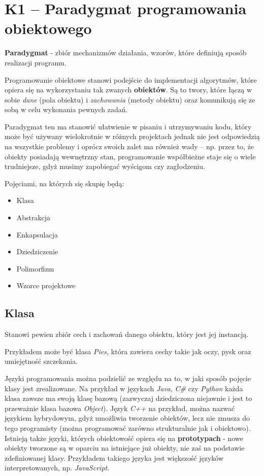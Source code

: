 \section{K1 -- Paradygmat programowania obiektowego}

\textbf{Paradygmat} - zbiór mechanizmów działania, wzorów, które definiują sposób realizacji programu.

Programowanie obiektowe stanowi podejście do implementacji algorytmów, które opiera się na wykorzystaniu tak zwanych \textbf{obiektów}. Są to twory, które łączą w sobie \textit{dane} (pola obiektu) i \textit{zachowania} (metody obiektu) oraz komunikują się ze sobą w celu wykonania pewnych zadań.

Paradygmat ten ma stanowić ułatwienie w pisaniu i utrzymywaniu kodu, który może być używany wielokrotnie w różnych projektach jednak nie jest odpowiedzią na wszystkie problemy i oprócz swoich zalet ma również wady -- np. przez to, że obiekty posiadają wewnętrzny stan, programowanie współbieżne staje się o wiele trudniejsze, gdyż musimy zapobiegać wyścigom czy zagłodzeniu.

Pojęciami, na których się skupię będą:
\begin{itemize}
	\item Klasa
	\item Abstrakcja
	\item Enkapsulacja
	\item Dziedziczenie
	\item Polimorfizm
	\item Wzorce projektowe
\end{itemize}

\subsection{Klasa}
Stanowi pewien zbiór cech i zachowań danego obiektu, który jest jej instancją.

Przykładem może być klasa \textit{Pies,} która zawiera cechy takie jak oczy, pysk oraz umiejętność szczekania.

Języki programowania można podzielić ze względu na to, w jaki sposób pojęcie klasy jest zrealizowane. Na przykład w językach \textit{Java}, \textit{C\#} czy \textit{Python} każda klasa zawsze ma swoją klasę bazową (zazwyczaj dziedziczona niejawnie i jest to przeważnie klasa bazowa \textit{Object}). Język \textit{C++} na przykład, można nazwać językiem hybrydowym, gdyż umożliwia tworzenie obiektów, lecz nie zmusza do tego programisty (można programować zarówno strukturalnie jak i obiektowo). Istnieją także języki, których obiektowość opiera się na \textbf{prototypach} - nowe obiekty tworzone są w oparciu na istniejące już obiekty, nie zaś na podstawie zdefiniowanej klasy. Przykładem takiego języka jest większość języków interpretowanych, np. \textit{JavaScript}.


